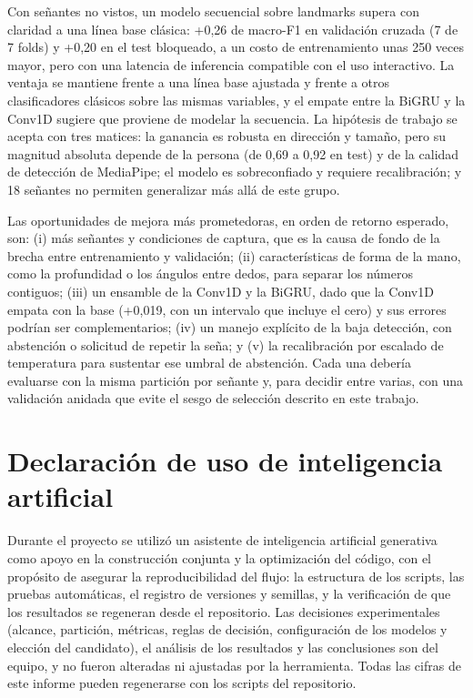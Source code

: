 \documentclass[11pt,a4paper]{article}
\begin{document}
Con señantes no vistos, un modelo secuencial sobre landmarks supera con claridad a una línea base clásica: +0,26 de macro-F1 en validación cruzada (7 de 7 folds) y +0,20 en el test bloqueado, a un costo de entrenamiento unas 250 veces mayor, pero con una latencia de inferencia compatible con el uso interactivo. La ventaja se mantiene frente a una línea base ajustada y frente a otros clasificadores clásicos sobre las mismas variables, y el empate entre la BiGRU y la Conv1D sugiere que proviene de modelar la secuencia. La hipótesis de trabajo se acepta con tres matices: la ganancia es robusta en dirección y tamaño, pero su magnitud absoluta depende de la persona (de 0,69 a 0,92 en test) y de la calidad de detección de MediaPipe; el modelo es sobreconfiado y requiere recalibración; y 18 señantes no permiten generalizar más allá de este grupo.

Las oportunidades de mejora más prometedoras, en orden de retorno esperado, son: (i) más señantes y condiciones de captura, que es la causa de fondo de la brecha entre entrenamiento y validación; (ii) características de forma de la mano, como la profundidad o los ángulos entre dedos, para separar los números contiguos; (iii) un ensamble de la Conv1D y la BiGRU, dado que la Conv1D empata con la base (+0,019, con un intervalo que incluye el cero) y sus errores podrían ser complementarios; (iv) un manejo explícito de la baja detección, con abstención o solicitud de repetir la seña; y (v) la recalibración por escalado de temperatura para sustentar ese umbral de abstención. Cada una debería evaluarse con la misma partición por señante y, para decidir entre varias, con una validación anidada que evite el sesgo de selección descrito en este trabajo.

\section*{Declaración de uso de inteligencia artificial}

Durante el proyecto se utilizó un asistente de inteligencia artificial generativa como apoyo en la construcción conjunta y la optimización del código, con el propósito de asegurar la reproducibilidad del flujo: la estructura de los scripts, las pruebas automáticas, el registro de versiones y semillas, y la verificación de que los resultados se regeneran desde el repositorio. Las decisiones experimentales (alcance, partición, métricas, reglas de decisión, configuración de los modelos y elección del candidato), el análisis de los resultados y las conclusiones son del equipo, y no fueron alteradas ni ajustadas por la herramienta. Todas las cifras de este informe pueden regenerarse con los scripts del repositorio.
\end{document}
